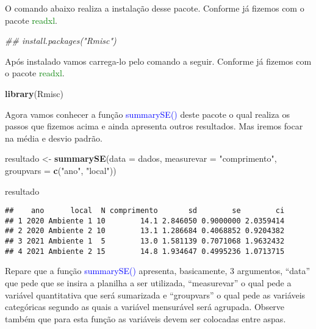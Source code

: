 \documentclass[14pt,titlepage, oneside, openany, a4paper]{book}
\newenvironment{Shaded}{\begin{snugshade}}{\end{snugshade}}
\newcommand{\CommentTok}[1]{\textcolor[rgb]{0.56,0.35,0.01}{\textit{#1}}}
\newcommand{\DataTypeTok}[1]{\textcolor[rgb]{0.13,0.29,0.53}{#1}}
\newcommand{\KeywordTok}[1]{\textcolor[rgb]{0.13,0.29,0.53}{\textbf{#1}}}
\newcommand{\NormalTok}[1]{#1}
\newcommand{\StringTok}[1]{\textcolor[rgb]{0.31,0.60,0.02}{#1}}
\begin{document}
O comando abaixo realiza a instalação desse pacote. Conforme já fizemos com o pacote \textcolor{green}{readxl}.

\begin{Shaded}
\begin{Highlighting}[]
\CommentTok{## install.packages("Rmisc")}
\end{Highlighting}
\end{Shaded}

Após instalado vamos carrega-lo pelo comando a seguir. Conforme já fizemos com o pacote \textcolor{green}{readxl}.

\begin{Shaded}
\begin{Highlighting}[]
\KeywordTok{library}\NormalTok{(Rmisc)}
\end{Highlighting}
\end{Shaded}

Agora vamos conhecer a função \textcolor{blue}{summarySE()} deste pacote o qual realiza os passos que fizemos acima e ainda apresenta outros resultados. Mas iremos focar na média e desvio padrão.

\begin{Shaded}
\begin{Highlighting}[]
\NormalTok{resultado <-}\StringTok{ }\KeywordTok{summarySE}\NormalTok{(}\DataTypeTok{data =}\NormalTok{ dados, }
                       \DataTypeTok{measurevar =} \StringTok{"comprimento"}\NormalTok{, }
                       \DataTypeTok{groupvars =} \KeywordTok{c}\NormalTok{(}\StringTok{"ano"}\NormalTok{, }\StringTok{"local"}\NormalTok{))}

\NormalTok{resultado}
\end{Highlighting}
\end{Shaded}

\begin{verbatim}
##    ano      local  N comprimento       sd        se        ci
## 1 2020 Ambiente 1 10        14.1 2.846050 0.9000000 2.0359414
## 2 2020 Ambiente 2 10        13.1 1.286684 0.4068852 0.9204382
## 3 2021 Ambiente 1  5        13.0 1.581139 0.7071068 1.9632432
## 4 2021 Ambiente 2 15        14.8 1.934647 0.4995236 1.0713715
\end{verbatim}

Repare que a função \textcolor{blue}{summarySE()} apresenta, basicamente, 3 argumentos, ``data'' que pede que se insira a planilha a ser utilizada, ``measurevar'' o qual pede a variável quantitativa que será sumarizada e ``groupvars'' o qual pede as variáveis categóricas segundo as quais a variável mensurável será agrupada. Observe também que para esta função as variáveis devem ser colocadas entre aspas.
\end{document}
